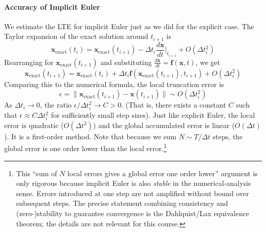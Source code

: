 \paragraph*{Accuracy of Implicit Euler}
We estimate the LTE for implicit Euler just as we did for the explicit case. The Taylor expansion of the exact solution around $t_{i+1}$ is
\begin{equation}
    \mathbf{x}_{\text{exact}}(t_i) = \mathbf{x}_{\text{exact}}(t_{i+1}) - \Delta t_i \frac{d\mathbf{x}}{dt}\bigg|_{t_{i+1}} + O(\Delta t_i^2)
\end{equation}
Rearranging for $\mathbf{x}_{\text{exact}}(t_{i+1})$ and substituting $\frac{d\mathbf{x}}{dt} = \mathbf{f}(\mathbf{x}, t)$, we get
\begin{equation}
    \mathbf{x}_{\text{exact}}(t_{i+1}) = \mathbf{x}_{\text{exact}}(t_i) + \Delta t_i \mathbf{f}(\mathbf{x}_{\text{exact}}(t_{i+1}), t_{i+1}) + O(\Delta t_i^2)
\end{equation}
Comparing this to the numerical formula, the local truncation error is
\begin{equation}
    \epsilon = \| \mathbf{x}_{\text{exact}}(t_{i+1}) - \mathbf{x}(t_{i+1}) \| \sim O(\Delta t_i^2)
\end{equation}
As $\Delta t_i \to 0$, the ratio $\epsilon / \Delta t_i^2 \to C > 0$. (That is, there exists a constant $C$ such that $\epsilon \approx C \Delta t_i^2$ for sufficiently small step sizes). Just like explicit Euler, the local error is quadratic ($O(\Delta t^2)$) and the global accumulated error is linear ($O(\Delta t)$). It is a first-order method. Note that because we sum $N \sim T/\Delta t$ steps, the global error is one order lower than the local error.\footnote{This ``sum of $N$ local errors gives a global error one order lower'' argument is only rigorous because implicit Euler is also \emph{stable} in the numerical-analysis sense. Errors introduced at one step are not amplified without bound over subsequent steps. The precise statement combining consistency and (zero-)stability to guarantee convergence is the Dahlquist/Lax equivalence theorem; the details are not relevant for this course.}

